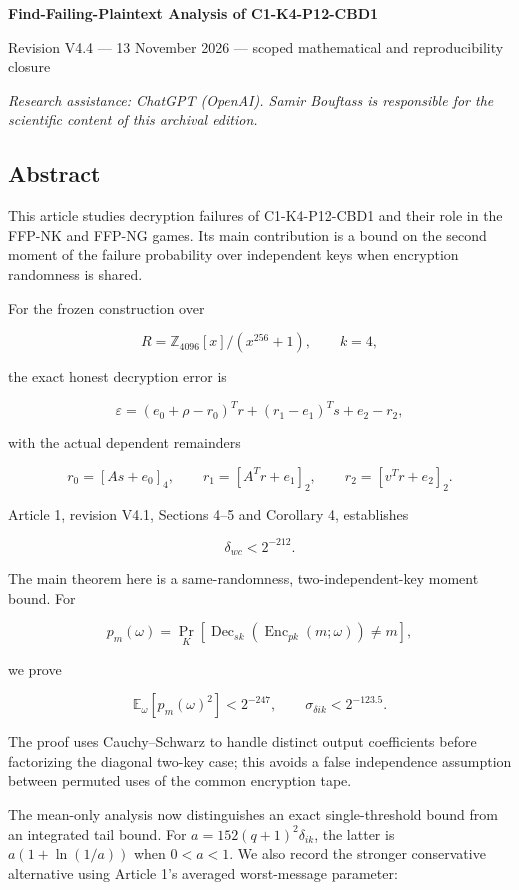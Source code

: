 \documentclass[11pt,a4paper]{article}
\begin{document}
{\LARGE\bfseries Find-Failing-Plaintext Analysis of C1-K4-P12-CBD1\par}
{\small Revision V4.4 — 13 November 2026 — scoped mathematical and reproducibility closure\par}
{\small\itshape Research assistance: ChatGPT (OpenAI). Samir Bouftass is responsible for the scientific content of this archival edition.\par}
\medskip
\subsection{Abstract}\label{abstract}

This article studies decryption failures of C1-K4-P12-CBD1 and their role in the FFP-NK and FFP-NG games. Its main contribution is a bound on the second moment of the failure probability over independent keys when encryption randomness is shared.

For the frozen construction over

\[
R=\mathbb Z_{4096}[x]/(x^{256}+1),\qquad k=4,
\]

the exact honest decryption error is

\[
\varepsilon=(e_0+\rho-r_0)^Tr+(r_1-e_1)^Ts+e_2-r_2,
\]

with the actual dependent remainders

\[
r_0=[As+e_0]_4,\qquad r_1=[A^Tr+e_1]_2,\qquad r_2=[v^Tr+e_2]_2.
\]

Article 1, revision V4.1, Sections 4--5 and Corollary 4, establishes

\[
\delta_{wc}<2^{-212}.
\]

The main theorem here is a same-randomness, two-independent-key moment bound. For

\[
p_m(\omega)=
\Pr_K[
\operatorname{Dec}_{sk}(\operatorname{Enc}_{pk}(m;\omega))\ne m
],
\]

we prove

\[
\mathbb E_\omega[p_m(\omega)^2]<2^{-247},
\qquad
\sigma_{\delta ik}<2^{-123.5}.
\]

The proof uses Cauchy--Schwarz to handle distinct output coefficients before factorizing the diagonal two-key case; this avoids a false independence assumption between permuted uses of the common encryption tape.

The mean-only analysis now distinguishes an exact single-threshold bound from an integrated tail bound. For \(a=152(q+1)^2\delta_{ik}\), the latter is \(a(1+\ln(1/a))\) when \(0<a<1\). We also record the stronger conservative alternative using Article 1's averaged worst-message parameter:
\end{document}
